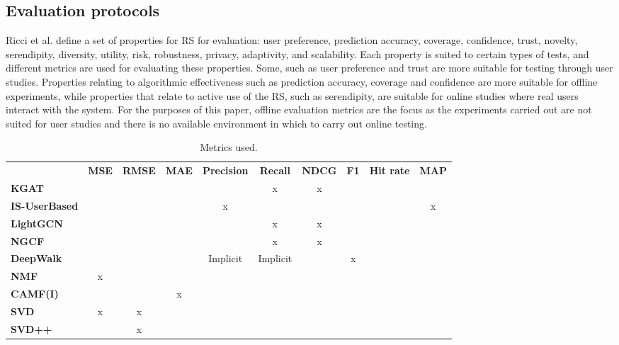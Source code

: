 \subsection{Evaluation protocols}\label{sec:evaluationmetrics}
Ricci et al.\cite{RecommenderHandbook2015} define a set of properties for RS for evaluation: user preference, prediction accuracy, coverage, confidence, trust, novelty, serendipity, diversity, utility, risk, robustness, privacy, adaptivity, and scalability.
Each property is suited to certain types of tests, and different metrics are used for evaluating these properties.
Some, such as user preference and trust are more suitable for testing through user studies.
Properties relating to algorithmic effectiveness such as prediction accuracy, coverage and confidence are more suitable for offline experiments, while properties that relate to active use of the RS, such as serendipity, are suitable for online studies where real users interact with the system.
For the purposes of this paper, offline evaluation metrics are the focus as the experiments carried out are not suited for user studies and there is no available environment in which to carry out online testing.
\begin{table*}[!htp]\centering
    \caption{Metrics used.}\label{tab:metricsused}
    \scriptsize
    \begin{tabular}{lccccccccc}\toprule
    &\textbf{MSE} &\textbf{RMSE} &\textbf{MAE} &\textbf{Precision} &\textbf{Recall} &\textbf{NDCG} &\textbf{F1} &\textbf{Hit rate} &\textbf{MAP} \\\cmidrule{2-10}
    \textbf{KGAT\cite{KGAT}} & & & & & x & x & & & \\\cmidrule{1-10}
    \textbf{IS-UserBased\cite{GraphBasedCollaborativePaper}} & & & & x & & & & & x \\\cmidrule{1-10}
    \textbf{LightGCN\cite{LightGCN}} & & & & & x & x & & & \\\cmidrule{1-10}
    \textbf{NGCF\cite{NGCF} } & & & & & x & x & & & \\\cmidrule{1-10}
    \textbf{DeepWalk\cite{DeepWalk}} & & & & Implicit & Implicit & & x & & \\\cmidrule{1-10}
    \textbf{NMF\cite{NMF} } & x & & & & & & & & \\\cmidrule{1-10}
    \textbf{CAMF(I)\cite{baltrunasCAMF} } & & & x & & & & & & \\\cmidrule{1-10}
    \textbf{SVD\cite{standardMF} } & x & x & & & & & & & \\\cmidrule{1-10}
    \textbf{SVD++\cite{svd++} } & & x & & & & & & & \\\cmidrule{1-10}
    \bottomrule

    \end{tabular}
\end{table*}

